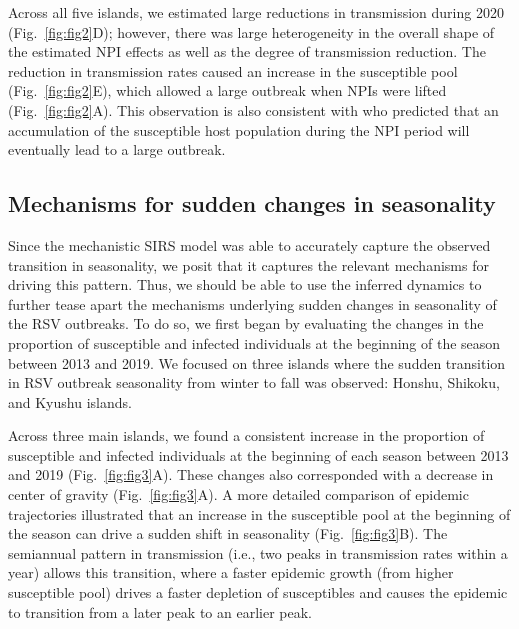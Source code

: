 \documentclass[12pt]{article}
\newcommand{\fref}[1]{Fig.~\ref{fig:#1}}
\begin{document}
Across all five islands, we estimated large reductions in transmission during 2020  (\fref{fig2}D);
however, there was large heterogeneity in the overall shape of the estimated NPI effects as well as the degree of transmission reduction.
The reduction in transmission rates caused an increase in the susceptible pool (\fref{fig2}E), which allowed a large outbreak when NPIs were lifted (\fref{fig2}A).
This observation is also consistent with \cite{baker2019epidemic} who predicted that an accumulation of the susceptible host population during the NPI period will eventually lead to a large outbreak.

\subsection*{Mechanisms for sudden changes in seasonality}

Since the mechanistic SIRS model was able to accurately capture the observed transition in seasonality, we posit that it captures the relevant mechanisms for driving this pattern.
Thus, we should be able to use the inferred dynamics to further tease apart the mechanisms underlying sudden changes in seasonality of the RSV outbreaks.
To do so, we first began by evaluating the changes in the proportion of susceptible and infected individuals at the beginning of the season between 2013 and 2019.
We focused on three islands where the sudden transition in RSV outbreak seasonality from winter to fall was observed: Honshu, Shikoku, and Kyushu islands. 

Across three main islands, we found a consistent increase in the proportion of susceptible and infected individuals at the beginning of each season between 2013 and 2019 (\fref{fig3}A).
These changes also corresponded with a decrease in center of gravity (\fref{fig3}A).
A more detailed comparison of epidemic trajectories illustrated that an increase in the susceptible pool at the beginning of the season can drive a sudden shift in seasonality (\fref{fig3}B).
The semiannual pattern in transmission (i.e., two peaks in transmission rates within a year) allows this transition, where a faster epidemic growth (from higher susceptible pool) drives a faster depletion of susceptibles and causes the epidemic to transition from a later peak to an earlier peak.
\end{document}
